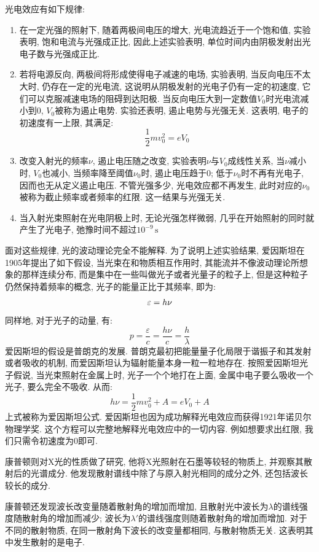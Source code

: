 光电效应有如下规律:
\begin{enumerate}
  \item 在一定光强的照射下, 随着两极间电压的增大, 光电流趋近于一个饱和值, 实验表明, 饱和电流与光强成正比, 因此上述实验表明, 单位时间内由阴极发射出光电子数与光强成正比.
  \item 若将电源反向, 两极间将形成使得电子减速的电场, 实验表明, 当反向电压不太大时, 仍存在一定的光电流, 这说明从阴极发射的光电子仍有一定的初速度, 它们可以克服减速电场的阻碍到达阳极. 当反向电压大到一定数值$V_0$时光电流减小到0, $V_0$被称为遏止电势. 实验还表明, 遏止电势与光强无关. 这表明, 电子的初速度有一上限, 其满足:
  \[
  \frac{1}{2}mv_0^2 = eV_0
  \]
  \item 改变入射光的频率$\nu$, 遏止电压随之改变, 实验表明$\nu$与$V_0$成线性关系, 当$\nu$减小时, $V_0$也减小, 当频率降至阈值$\nu_0$时, 遏止电压趋于$0$; 低于$\nu_0$时不再有光电子, 因而也无从定义遏止电压. 不管光强多少, 光电效应都不再发生, 此时对应的$\nu_0$被称为截止频率或者频率的红限. 这一结果与光强无关.
  \item 当入射光束照射在光电阴极上时, 无论光强怎样微弱, 几乎在开始照射的同时就产生了光电子, 弛豫时间不超过$10^{-9}\,\mathrm{s}$
\end{enumerate}
面对这些规律, 光的波动理论完全不能解释. 为了说明上述实验结果, 爱因斯坦在1905年提出了如下假设, 当光束在和物质相互作用时, 其能流并不像波动理论所想象的那样连续分布, 而是集中在一些叫做光子或者光量子的粒子上, 但是这种粒子仍然保持着频率的概念, 光子的能量正比于其频率, 即为:
\[
\mathop{}\!\varepsilon = h\nu
\]
同样地, 对于光子的动量, 有:
\[
p = \frac{\varepsilon}{c} = \frac{h \nu}{c} = \frac{h}{\lambda}
\]
爱因斯坦的假设是普朗克的发展. 普朗克最初把能量量子化局限于谐振子和其发射或者吸收的机制, 而爱因斯坦认为辐射能量本身一粒一粒地存在. 按照爱因斯坦光子假说, 当光束照射在金属上时, 光子一个个地打在上面, 金属中电子要么吸收一个光子, 要么完全不吸收. 从而:
\[
h \nu = \frac{1}{2}mv_0^2+A=eV_0+A
\]
上式被称为爱因斯坦公式. 爱因斯坦也因为成功解释光电效应而获得1921年诺贝尔物理学奖. 这个方程可以完整地解释光电效应中的一切内容. 例如想要求出红限, 我们只需令初速度为0即可.

康普顿则对X光的性质做了研究, 他将X光照射在石墨等较轻的物质上, 并观察其散射后的光谱成分. 他发现散射谱线中除了与原入射光相同的成分之外, 还包括波长较长的成分.


康普顿还发现波长改变量随着散射角的增加而增加, 且散射光中波长为$\lambda$的谱线强度随散射角的增加而减少; 波长为$\lambda'$的谱线强度则随着散射角的增加而增加. 对于不同的散射物质, 在同一散射角下波长的改变量都相同, 与散射物质无关. 这表明其中发生散射的是电子.

